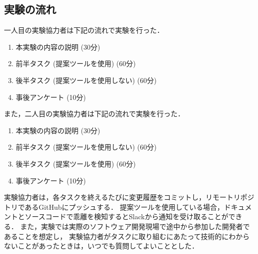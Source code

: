 \subsection{実験の流れ}
一人目の実験協力者は下記の流れで実験を行った．
\begin{enumerate}
    \item 本実験の内容の説明 (30分)
    \item 前半タスク (提案ツールを使用) (60分)
    \item 後半タスク (提案ツールを使用しない) (60分)
    \item 事後アンケート (10分)
\end{enumerate}

また，二人目の実験協力者は下記の流れで実験を行った．
\begin{enumerate}
    \item 本実験の内容の説明 (30分)
    \item 前半タスク (提案ツールを使用しない) (60分)
    \item 後半タスク (提案ツールを使用) (60分)
    \item 事後アンケート (10分)
\end{enumerate}

実験協力者は，各タスクを終えるたびに変更履歴をコミットし，リモートリポジトリであるGitHubにプッシュする．
提案ツールを使用している場合，ドキュメントとソースコードで乖離を検知するとSlackから通知を受け取ることができる．
また，実験では実際のソフトウェア開発現場で途中から参加した開発者であることを想定し，
実験協力者がタスクに取り組むにあたって技術的にわからないことがあったときは，いつでも質問してよいこととした．